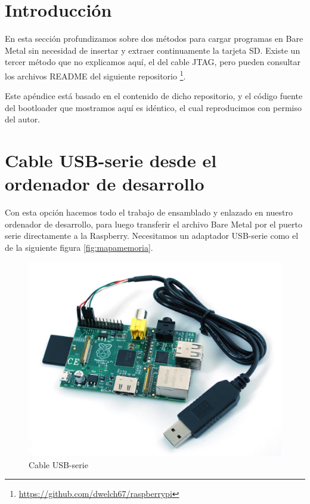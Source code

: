 
\pagestyle{fancy}
\fancyhead[LE,RO]{\thepage}
\fancyhead[LO]{\nouppercase{\rightmark}}

\label{chp:SerieBoot}
\minitoc

\section{Introducción}

En esta sección profundizamos sobre dos métodos para cargar programas en Bare Metal sin
necesidad de insertar y extraer continuamente la tarjeta SD. Existe un tercer método que
no explicamos aquí, el del cable JTAG, pero pueden consultar los archivos
README del siguiente repositorio \footnote{\url{https://github.com/dwelch67/raspberrypi}}.

Este apéndice está basado en el contenido de dicho repositorio, y el código fuente del
bootloader que mostramos aquí es idéntico, el cual reproducimos con permiso del autor.

\section{Cable USB-serie desde el ordenador de desarrollo}

Con esta opción hacemos todo el trabajo de ensamblado y enlazado en nuestro ordenador
de desarrollo, para luego transferir el archivo Bare Metal por el puerto serie
directamente a la Raspberry. Necesitamos un adaptador USB-serie como el de la siguiente
figura \ref{fig:mapamemoria}.

\begin{figure}[h]
  \centering
    \includegraphics[width=14cm]{graphs/ARM_RaspberryPi_serial.jpg}
  \caption{Cable USB-serie}
  \label{fig:cableusb}
\end{figure}

